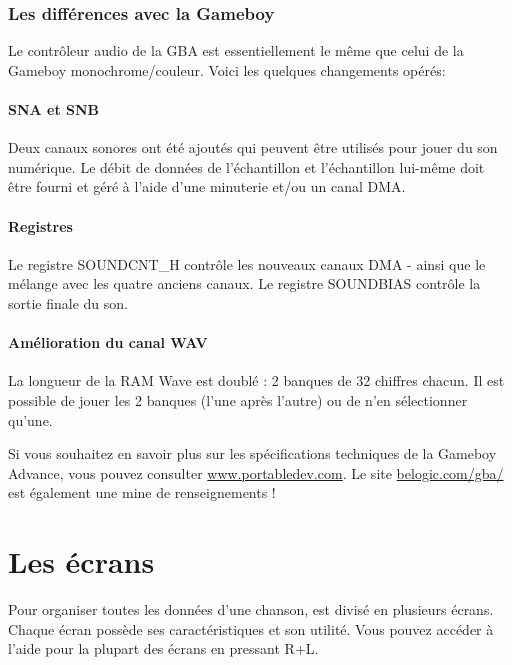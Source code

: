 \documentclass[12pt,a4paper]{article}
\begin{document}

        \subsubsection{Les différences avec la Gameboy}

        Le contrôleur audio de la GBA est essentiellement le même que celui de la Gameboy monochrome/couleur. Voici les quelques changements opérés:

            \paragraph{SNA et SNB} Deux canaux sonores ont été ajoutés qui peuvent être utilisés pour jouer du son numérique. Le débit de données de l'échantillon et l'échantillon lui-même doit être fourni et géré à l'aide d'une minuterie et/ou un canal DMA.

            \paragraph{Registres} Le registre SOUNDCNT\_H contrôle les nouveaux canaux DMA - ainsi que le mélange avec les quatre anciens canaux. Le registre SOUNDBIAS contrôle la sortie finale du son.

            \paragraph{Amélioration du canal WAV} La longueur de la RAM Wave est doublé : 2 banques de 32 chiffres chacun. Il est possible de jouer les 2 banques (l'une après l'autre) ou de n'en sélectionner qu'une.

            \medskip
  Si vous souhaitez en savoir plus sur les spécifications techniques de la Gameboy Advance, vous pouvez consulter \href{http://www.portabledev.com/media/GBA/tutoriels/gbatek.htm}{www.portabledev.com}. Le site \href{http://belogic.com/gba/}{belogic.com/gba/} est également une mine de renseignements !

  \section{Les écrans}

    Pour organiser toutes les données d'une chanson, \FAT est divisé en plusieurs écrans. Chaque écran possède ses caractéristiques et son utilité. Vous pouvez accéder à l'aide pour la plupart des écrans en pressant R+L.
\end{document}

